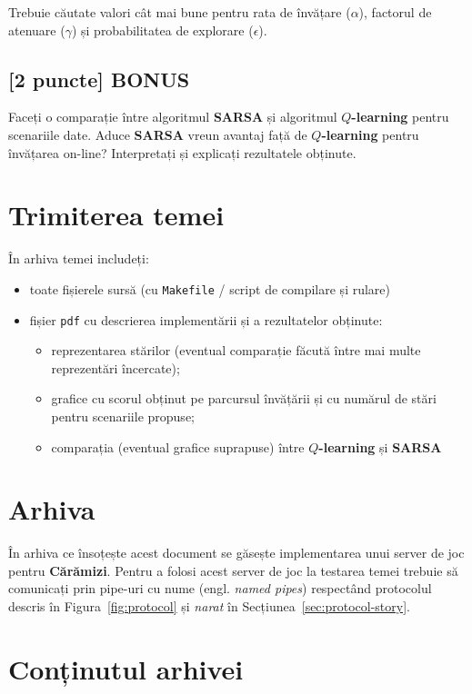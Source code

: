 \documentclass[12pt]{article}
\newcommand{\sarsa}{{\color{blue(pigment)} \textbf{SARSA}}}
\newcommand{\qlearn}{{\color{blue(pigment)} $Q$\textbf{-learning}}}
\newcommand{\caramizi}{{\color{darkygray} \textbf{Cărămizi}}}
\newcommand{\engl}{{\color{darkygray}engl. }}
\begin{document}
Trebuie căutate valori cât mai bune pentru rata de învățare
($\alpha$), factorul de atenuare ($\gamma$) și probabilitatea de
explorare ($\epsilon$).

\subsection*{[2 puncte] BONUS}
\label{sec:bonus}

Faceți o comparație între algoritmul \sarsa{} și algoritmul \qlearn{}
pentru scenariile date. Aduce \sarsa{} vreun avantaj față de \qlearn{}
pentru învățarea on-line? Interpretați și explicați rezultatele
obținute.

\section{Trimiterea temei}
\label{sec:homework}

În arhiva temei includeți:
\begin{itemize}
\item toate fișierele sursă (cu \texttt{Makefile} / script de
  compilare și rulare)
\item fișier \texttt{pdf} cu descrierea implementării și a
  rezultatelor obținute:
  \begin{itemize}
  \item reprezentarea stărilor (eventual comparație făcută între mai
    multe reprezentări încercate);
  \item grafice cu scorul obținut pe parcursul învățării și cu numărul
    de stări pentru scenariile propuse;
  \item comparația (eventual grafice suprapuse) între \qlearn{} și
    \sarsa{}
  \end{itemize}
\end{itemize}

\appendix
\section{Arhiva}
\label{sec:code}

În arhiva ce însoțește acest document se găsește implementarea unui
server de joc pentru \caramizi. Pentru a folosi acest server de
joc la testarea temei trebuie să comunicați prin pipe-uri cu nume
(\engl{} \emph{named pipes}) respectând protocolul descris în
Figura~\ref{fig:protocol} și \emph{narat} în
Secțiunea~\ref{sec:protocol-story}.

\section{Conținutul arhivei}
\label{sec:archive}
\end{document}
